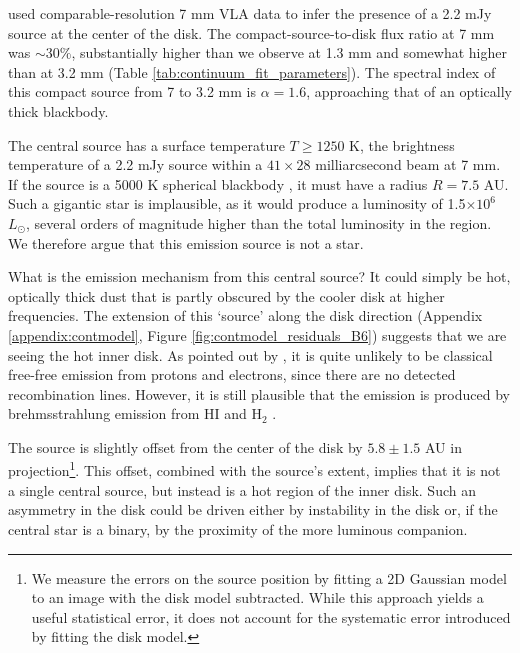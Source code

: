 \documentclass[twocolumn]{aastex61}
\newcommand{\lsun}{\ensuremath{L_{\odot}}\xspace}			%
\newcommand{\hh}{\ensuremath{\textrm{H}_{2}}\xspace}			%
\def\ee#1{\ensuremath{\times10^{#1}}}
\begin{document}
\citet{Reid2007a} used comparable-resolution 7 mm VLA data to infer
the presence of a 2.2 mJy source at the center of the \sourcei disk.
The compact-source-to-disk flux ratio at 7 mm was $\sim30\%$, substantially
higher than we observe at 1.3 mm and somewhat
higher than at 3.2 mm (Table \ref{tab:continuum_fit_parameters}).  
The spectral index of this compact source from 7 to 3.2 mm is $\alpha=1.6$,
approaching that of an optically
thick blackbody.

The central source has a surface temperature $T\geq1250$ K, the brightness
temperature of a 2.2 mJy source within a $41\times28$ milliarcsecond beam at 7
mm.  If the source is a 5000 K spherical blackbody \citep[e.g.,][]{Testi2010a},
it must have a radius $R=7.5$ AU.  Such a gigantic star is implausible, as it
would produce a luminosity of 1.5\ee{6} \lsun, several orders of magnitude
higher than the total luminosity in the region.  We therefore argue
that this emission source is not a star.

What is the emission mechanism from this central source?
It could simply be hot, optically thick dust that is partly obscured by the
cooler disk at higher frequencies.  The  extension of this `source' along the
disk direction (Appendix \ref{appendix:contmodel}, Figure
\ref{fig:contmodel_residuals_B6}) suggests that we are
seeing the hot inner disk.  As pointed out by \citet{Plambeck2016a}, it is
quite unlikely to be classical free-free emission from protons
and electrons, since there are no detected
recombination lines.  However, it is still plausible that the emission is
produced by brehmsstrahlung emission from HI and \hh
\citep{Reid2007a,Baez-Rubio2018a}.

The source is slightly offset from the center of the disk by $5.8\pm1.5$ AU in
projection\footnote{We measure the errors on the source position by fitting a
2D Gaussian model to an image with the disk model subtracted.  While this approach
yields a useful statistical error, it does not account for the systematic error
introduced by fitting the disk model. }.  This offset,
combined with the source's extent, implies that it is
not a single central source, but
instead is a hot region of the inner disk.  Such an asymmetry in the disk could
be driven either by instability in the disk or, if the central star is a
binary, by the proximity of the more luminous companion.
\end{document}
